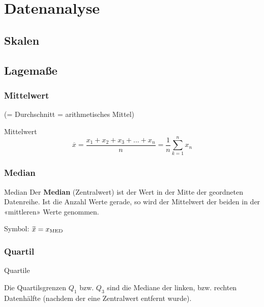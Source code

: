\section*{Datenanalyse}

\subsection*{Skalen}
\vspace{5mm}


\hrulefill
\begin{multicols}{2}

\subsection*{Lagemaße}
\subsubsection*{Mittelwert}
(= Durchschnitt = arithmetisches Mittel)

\begin{definition*}{Mittelwert}{}
$$\overline{x} = \frac{x_1 + x_2 + x_3 + ... + x_n}{n}=  \frac1n\sum_{k=1}^nx_n$$
\end{definition*}

\subsubsection*{Median}
\begin{definition*}{Median}{}
Der \textbf{Median} (Zentralwert) ist der Wert in der Mitte der geordneten Datenreihe. Ist
die Anzahl Werte gerade, so wird der Mittelwert der beiden in der
«mittleren» Werte genommen.

Symbol: $\widetilde{x} = x_{\textrm{MED}}$
\end{definition*}

\subsubsection*{Quartil}

\begin{rezept*}{Quartile}{}

Die Quartilsgrenzen $Q_1$ bzw. $Q_3$ sind die Mediane der linken,
bzw. rechten Datenhälfte (nachdem der eine Zentralwert entfernt
wurde).
\end{rezept*}


\end{multicols}
